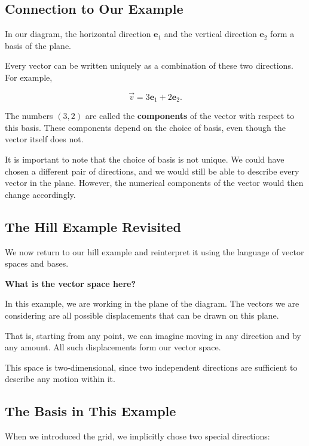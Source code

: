 \documentclass[11pt,openany]{book}
\theoremstyle{definition}
\begin{document}
\medskip

\subsection{Connection to Our Example}

In our diagram, the horizontal direction $\mathbf{e}_1$ and the vertical direction $\mathbf{e}_2$ form a basis of the plane.

Every vector can be written uniquely as a combination of these two directions. 
For example,

\[
\vec{v} = 3\mathbf{e}_1 + 2\mathbf{e}_2.
\]

The numbers $(3,2)$ are called the \textbf{components} of the vector with respect to this basis.
These components depend on the choice of basis, even though the vector itself does not.
\medskip

It is important to note that the choice of basis is not unique. 
We could have chosen a different pair of directions, and we would still be able to describe every vector in the plane. 
However, the numerical components of the vector would then change accordingly.


\subsection{The Hill Example Revisited}

We now return to our hill example and reinterpret it using the language of vector spaces and bases.

\medskip
 
\textbf{What is the vector space here?}

In this example, we are working in the plane of the diagram. 
The vectors we are considering are all possible displacements that can be drawn on this plane.

That is, starting from any point, we can imagine moving in any direction and by any amount. 
All such displacements form our vector space.

This space is two-dimensional, since two independent directions are sufficient to describe any motion within it.

\medskip

\subsection{The Basis in This Example}

When we introduced the grid, we implicitly chose two special directions:
\end{document}
